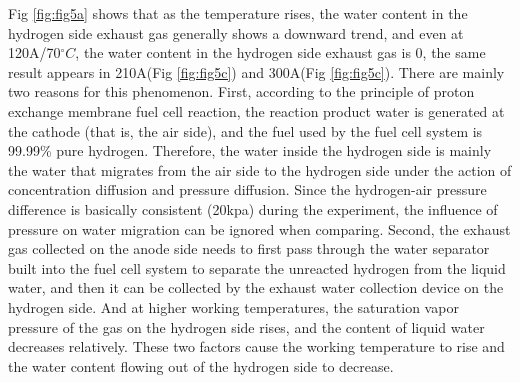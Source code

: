 
\par
Fig \ref{fig:fig5a} shows that as the temperature rises, the water content in the hydrogen side exhaust gas generally shows a downward trend, and even at 120A/70$^{\circ}C$, the water content in the hydrogen side exhaust gas is 0, the same result appears in 210A(Fig \ref{fig:fig5c}) and 300A(Fig \ref{fig:fig5c}). There are mainly two reasons for this phenomenon.  First, according to the principle of proton exchange membrane fuel cell reaction, the reaction product water is generated at the cathode (that is, the air side), and the fuel used by the fuel cell system is 99.99\% pure hydrogen. Therefore, the water inside the hydrogen side is mainly the water that migrates from the air side to the hydrogen side under the action of concentration diffusion and pressure diffusion. Since the hydrogen-air pressure difference is basically consistent (20kpa) during the experiment, the influence of pressure on water migration can be ignored when comparing. Second, the exhaust gas collected on the anode side needs to first pass through the water separator built into the fuel cell system to separate the unreacted hydrogen from the liquid water, and then it can be collected by the exhaust water collection device on the hydrogen side. And at higher working temperatures, the saturation vapor pressure of the gas on the hydrogen side rises, and the content of liquid water decreases relatively. These two factors cause the working temperature to rise and the water content flowing out of the hydrogen side to decrease.

